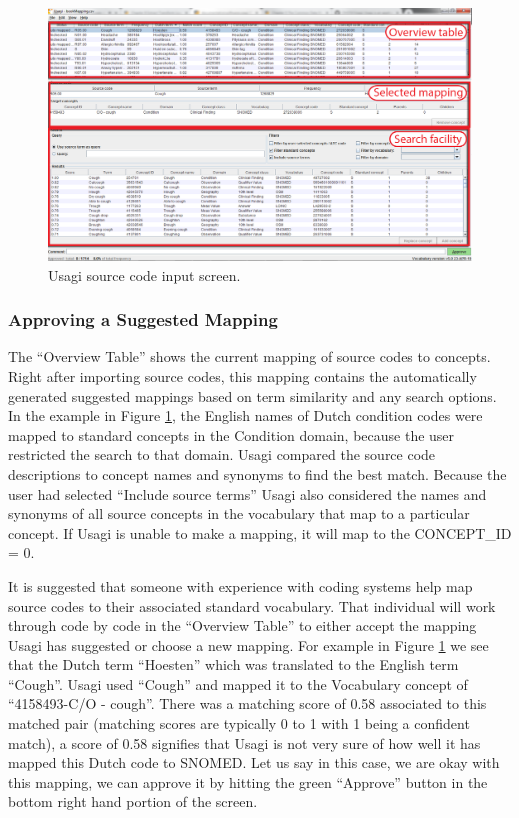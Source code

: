 \documentclass[11pt]{book}
\theoremstyle{definition}
\theoremstyle{definition}
\theoremstyle{definition}
\theoremstyle{remark}
\begin{document}
\begin{figure}

{\centering \includegraphics[width=1\linewidth]{images/ExtractTransformLoad/usagiOverview} 

}

\caption{Usagi source code input screen.}\label{fig:usagiOverview}
\end{figure}

\subsubsection*{Approving a Suggested
Mapping}\label{approving-a-suggested-mapping}

The ``Overview Table'' shows the current mapping of source codes to
concepts. Right after importing source codes, this mapping contains the
automatically generated suggested mappings based on term similarity and
any search options. In the example in Figure \ref{fig:usagiOverview},
the English names of Dutch condition codes were mapped to standard
concepts in the Condition domain, because the user restricted the search
to that domain. Usagi compared the source code descriptions to concept
names and synonyms to find the best match. Because the user had selected
``Include source terms'' Usagi also considered the names and synonyms of
all source concepts in the vocabulary that map to a particular concept.
If Usagi is unable to make a mapping, it will map to the CONCEPT\_ID =
0.

It is suggested that someone with experience with coding systems help
map source codes to their associated standard vocabulary. That
individual will work through code by code in the ``Overview Table'' to
either accept the mapping Usagi has suggested or choose a new mapping.
For example in Figure \ref{fig:usagiOverview} we see that the Dutch term
``Hoesten'' which was translated to the English term ``Cough''. Usagi
used ``Cough'' and mapped it to the Vocabulary concept of ``4158493-C/O
- cough''. There was a matching score of 0.58 associated to this matched
pair (matching scores are typically 0 to 1 with 1 being a confident
match), a score of 0.58 signifies that Usagi is not very sure of how
well it has mapped this Dutch code to SNOMED. Let us say in this case,
we are okay with this mapping, we can approve it by hitting the green
``Approve'' button in the bottom right hand portion of the screen.
\end{document}
